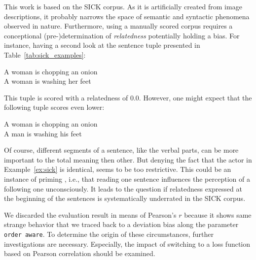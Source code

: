 This work is based on the SICK corpus. As it is artificially created from image descriptions, it probably narrows the space of semantic and syntactic phenomena observed in nature. Furthermore, using a manually scored corpus requires a conceptional (pre-)determination of \textit{relatedness} potentially holding a bias. For instance, having a second look at the sentence tuple presented in Table~\ref{tab:sick_examples}:
\begin{exe}
	\ex \label{ex:sick} A woman is chopping an onion \\
		A woman is washing her feet
\end{exe}
This tuple is scored with a relatedness of $0.0$. However, one might expect that the following tuple scores even lower:
\begin{exe}
	\ex \label{ex:no_sick} A woman is chopping an onion \\
		A man is washing his feet
\end{exe}
Of course, different segments of a sentence, like the verbal parts, can be more important to the total meaning then other. But denying the fact that the actor in Example~\ref{ex:sick} is identical, seems to be too restrictive. This could be an instance of priming \autocite{weingarten_primed_2016}, i.e., that reading one sentence influences the perception of a following one unconsciously. It leads to the question if relatedness expressed at the beginning of the sentences is systematically underrated in the SICK corpus.

We discarded the evaluation result in means of Pearson's $r$ because it shows same strange behavior that we traced back to a deviation bias along the parameter \texttt{order aware}. To determine the origin of these circumstances, further investigations are necessary. Especially, the impact of switching to a loss function based on Pearson correlation should be examined.



